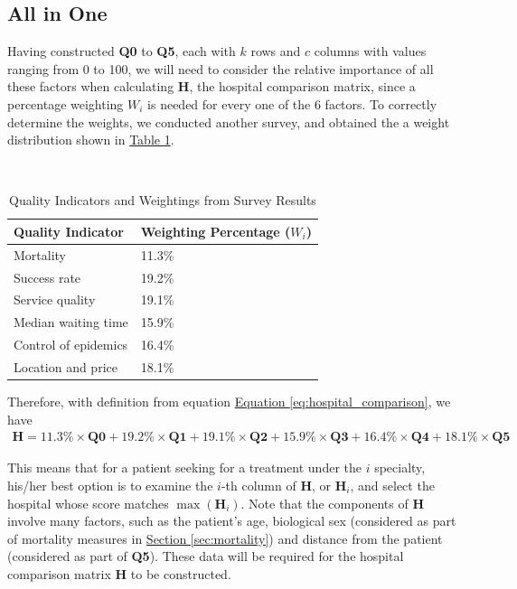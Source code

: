\documentclass{article}
\begin{document}
\subsection{All in One}

Having constructed \textbf{Q0} to \textbf{Q5}, each with $k$ rows and $c$ columns with values ranging from 0 to 100, we will need to consider the relative importance of all these factors when calculating \textbf{H}, the hospital comparison matrix, since a percentage weighting $W_i$ is needed for every one of the 6 factors. To correctly determine the weights, we conducted another survey, and obtained the a weight distribution shown in \hyperref[tab:weightings]{Table \ref*{tab:weightings}}.

{\renewcommand{\arraystretch}{1.2}%
\begin{table}[htbp]
    \centering
        \caption{Quality Indicators and Weightings from Survey Results}\\[4pt]
    \begin{tabular}{l|l}
        \textbf{Quality Indicator} & \textbf{Weighting Percentage ($W_i$)}\\
        \hline
        Mortality & 11.3\% \\
        Success rate & 19.2\% \\
        Service quality & 19.1\% \\
        Median waiting time & 15.9\% \\
        Control of epidemics & 16.4\% \\
        Location and price & 18.1\%
    \end{tabular}    \label{tab:weightings}
\end{table}}

Therefore, with definition from equation \hyperref[eq:hospital_comparison]{Equation \ref*{eq:hospital_comparison}}, we have
\begin{gather}
    \mathbf{H} = 11.3\% \times \mathbf{Q0} + 19.2\% \times \mathbf{Q1} + 19.1\% \times \mathbf{Q2} + 15.9\% \times \mathbf{Q3} + 16.4\% \times \mathbf{Q4} + 18.1\% \times \mathbf{Q5}
\end{gather}

This means that for a patient seeking for a treatment under the $i$ specialty, his/her best option is to examine the $i$-th column of \textbf{H}, or $\mathbf{H}_i$, and select the hospital whose score matches $\max\left(\mathbf{H}_i\right)$. Note that the components of \textbf{H} involve many factors, such as the patient's age, biological sex (considered as part of mortality measures in \hyperref[sec:mortality]{Section \ref*{sec:mortality}}) and distance from the patient (considered as part of \textbf{Q5}). These data will be required for the hospital comparison matrix \textbf{H} to be constructed.
\end{document}
